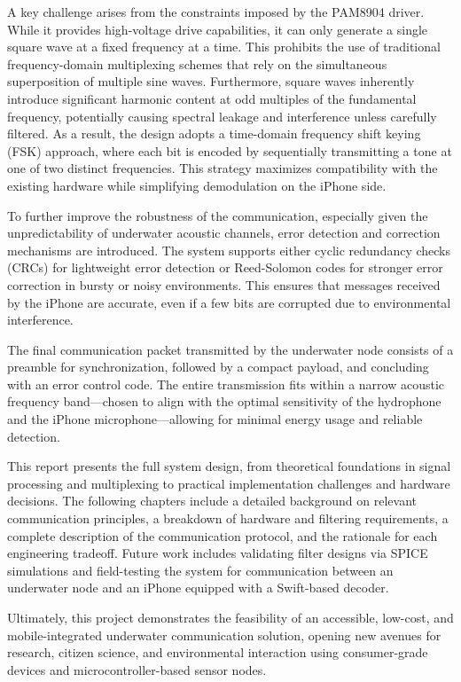 A key challenge arises from the constraints imposed by the PAM8904 driver. While it provides high-voltage drive capabilities, it can only generate a single square wave at a fixed frequency at a time. This prohibits the use of traditional frequency-domain multiplexing schemes that rely on the simultaneous superposition of multiple sine waves. Furthermore, square waves inherently introduce significant harmonic content at odd multiples of the fundamental frequency, potentially causing spectral leakage and interference unless carefully filtered. As a result, the design adopts a time-domain frequency shift keying (FSK) approach, where each bit is encoded by sequentially transmitting a tone at one of two distinct frequencies. This strategy maximizes compatibility with the existing hardware while simplifying demodulation on the iPhone side.

To further improve the robustness of the communication, especially given the unpredictability of underwater acoustic channels, error detection and correction mechanisms are introduced. The system supports either cyclic redundancy checks (CRCs) for lightweight error detection or Reed-Solomon codes for stronger error correction in bursty or noisy environments. This ensures that messages received by the iPhone are accurate, even if a few bits are corrupted due to environmental interference.

The final communication packet transmitted by the underwater node consists of a preamble for synchronization, followed by a compact payload, and concluding with an error control code. The entire transmission fits within a narrow acoustic frequency band—chosen to align with the optimal sensitivity of the hydrophone and the iPhone microphone—allowing for minimal energy usage and reliable detection.

This report presents the full system design, from theoretical foundations in signal processing and multiplexing to practical implementation challenges and hardware decisions. The following chapters include a detailed background on relevant communication principles, a breakdown of hardware and filtering requirements, a complete description of the communication protocol, and the rationale for each engineering tradeoff. Future work includes validating filter designs via SPICE simulations and field-testing the system for communication between an underwater node and an iPhone equipped with a Swift-based decoder.

Ultimately, this project demonstrates the feasibility of an accessible, low-cost, and mobile-integrated underwater communication solution, opening new avenues for research, citizen science, and environmental interaction using consumer-grade devices and microcontroller-based sensor nodes.

